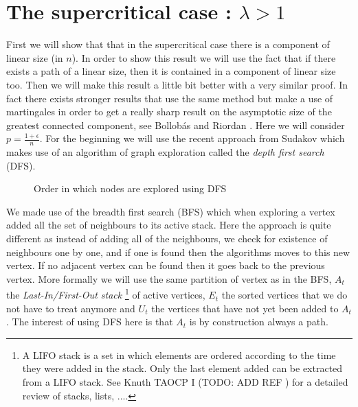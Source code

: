 \section{The supercritical case : $\lambda > 1 $ }
First we will show that that in the supercritical case there is a component of linear size (in $n$). In order to show this result we will use the fact that if there exists a path of a linear size, then it is contained in a component of linear size too. Then we will make this result a little bit better with a very similar proof.
\newline
In fact there exists stronger results that use the same method but make a use of martingales in order to get a really sharp result on the asymptotic size of the greatest connected component, see Bollob\'as and Riordan \cite{BollobRiordan12}.
\newline
Here we will consider $p = \frac{1 + \epsilon}{n}$. 
For the beginning we will use the recent approach from Sudakov \cite{Sudakov} which makes use of an algorithm of graph exploration called the \emph{depth first search} (DFS).
\begin{figure}
    \centering
    \caption{Order in which nodes are explored using DFS}
    \label{fig:DFS}
\end{figure}
We made use of the breadth first search (BFS) which when exploring a vertex added all the set of neighbours to its active stack.
Here the approach is quite different as instead of adding all of the neighbours, we check for existence of neighbours one by one, and if one is found then the algorithms moves to this new vertex. If no adjacent vertex can be found then it goes back to the previous vertex.
\newline
More formally we will use the same partition of vertex as in the BFS, $A_t$ the \emph{Last-In/First-Out stack}
\footnote{A LIFO stack is a set in which elements are ordered according to the time they were added in the stack. 
Only the last element added can be extracted from a LIFO stack. See Knuth TAOCP I (TODO: ADD REF ) for a detailed review of stacks, lists, ....}
of active vertices, $E_t$ the sorted vertices that we do not have to treat anymore and $U_t$ the vertices that have not yet been added to $A_t$.
The interest of using DFS here is that $A_t$ is by construction always a path.
\newline
